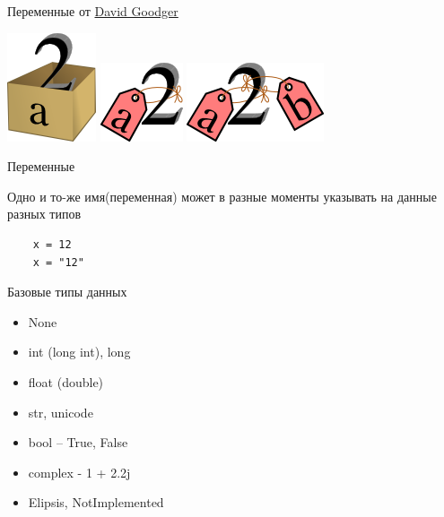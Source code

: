 \documentclass{article}
\begin{document}
\begin{center} Переменные от 
\href{http://python.net/~goodger/projects/pycon/2007/idiomatic/handout.html}{David Goodger}
\end{center}
\includegraphics{images/a2box.png} \hspace{3cm}
\includegraphics{images/a2tag.png} \hspace{3cm}
\includegraphics{images/ab2tag.png} \\
\newpage

\begin{center} Переменные \end{center}
Одно и то-же имя(переменная) может в разные моменты указывать на данные разных типов
\vspace{15pt}
\begin{lstlisting}
	x = 12
	x = "12"
\end{lstlisting}
\newpage

\begin{center} Базовые типы данных \end{center}
\begin{itemize}
	\item None
	\item int (long int), long
	\item float (double)
	\item str, unicode
	\item bool – True, False
	\item complex - 1 + 2.2j
	\item Elipsis, NotImplemented
\end{itemize}
\newpage
\end{document}
